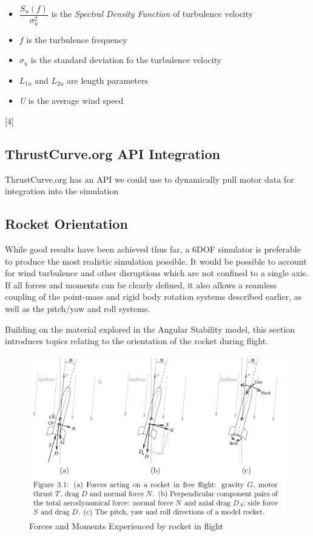 \documentclass[]{article}
\providecommand{\tightlist}{%
  \setlength{\itemsep}{0pt}\setlength{\parskip}{0pt}}
\begin{document}
\begin{itemize}
\tightlist
\item
  \(\dfrac{S_u (f)}{\sigma ^2 _ u}\) is the \emph{Spectral Density
  Function} of turbulence velocity
\item
  \(f\) is the turbulence frequency
\item
  \(\sigma_u\) is the standard deviation fo the turbulence velocity
\item
  \(L_{1u}\) and \(L_{2u}\) are length parameters
\item
  \emph{U} is the average wind speed
\end{itemize}

{[}4{]}

\subsection{ThrustCurve.org API
Integration}\label{thrustcurve.org-api-integration}

ThrustCurve.org has an API we could use to dynamically pull motor data
for integration into the simulation

\subsection{Rocket Orientation}\label{rocket-orientation}

While good results have been achieved thus far, a 6DOF simulator is
preferable to produce the most realistic simulation possible. It would
be possible to account for wind turbulence and other disruptions which
are not confined to a single axis. If all forces and moments can be
clearly defined, it also allows a seamless coupling of the point-mass
and rigid body rotation systems described earlier, as well as the
pitch/yaw and roll systems.

Building on the material explored in the Angular Stability model, this
section introduces topics relating to the orientation of the rocket
during flight.

\begin{figure}[htbp]
\centering
\includegraphics{images/rocket_flight_forces_moments.png}
\caption{Forces and Moments Experienced by rocket in flight
\label{img_rocket_flight_forces_moments_label}}
\end{figure}
\end{document}
